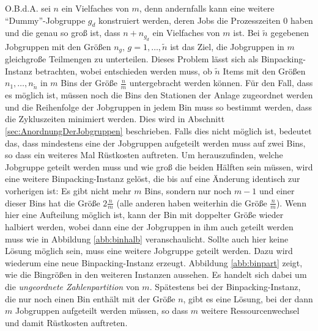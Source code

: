 \documentclass{scrreprt}
\begin{document}
O.B.d.A. sei $n$ ein Vielfaches von $m$, denn andernfalls kann eine weitere "`Dummy"'-Jobgruppe $g_d$ konstruiert werden,
deren Jobs die Prozesszeiten $0$ haben und die genau so groß ist, dass $n+n_{g_d}$ ein Vielfaches von $m$ ist.
Bei $\tilde{n}$ gegebenen Jobgruppen mit den Größen $n_g, \, g=1,\ldots,\tilde{n}$ ist das Ziel,
die Jobgruppen in $m$ gleichgroße Teilmengen zu unterteilen.
Dieses Problem lässt sich als Binpacking-Instanz betrachten, wobei entschieden werden muss, ob $\tilde{n}$ Items 
mit den Größen $n_1,\ldots,n_{\tilde{n}}$ in $m$ Bins der Größe $\frac{n}{m}$ untergebracht werden können.
Für den Fall, dass es möglich ist, müssen noch die Bins den Stationen der Anlage zugeordnet werden und die Reihenfolge
der Jobgruppen in jedem Bin muss so bestimmt werden, dass die Zykluszeiten minimiert werden.
Dies wird in Abschnitt \ref{sec:AnordnungDerJobgruppen} beschrieben.
Falls dies nicht möglich ist, bedeutet das, dass mindestens eine der Jobgruppen aufgeteilt werden muss auf zwei Bins,
so dass ein weiteres Mal Rüstkosten auftreten.
Um herauszufinden, welche Jobgruppe geteilt werden muss und wie groß die beiden Hälften sein müssen,
wird eine weitere Binpacking-Instanz gelöst, die bis auf eine Änderung identisch zur vorherigen ist:
Es gibt nicht mehr $m$ Bins, sondern nur noch $m-1$ und einer dieser Bins hat die Größe $2\frac{n}{m}$ (alle anderen haben weiterhin die Größe $\frac{n}{m}$).
Wenn hier eine Aufteilung möglich ist, kann der Bin mit doppelter Größe wieder halbiert werden,
wobei dann eine der Jobgruppen in ihm auch geteilt werden muss wie in Abbildung \ref{abb:binhalb} veranschaulicht.
Sollte auch hier keine Lösung möglich sein, muss eine weitere Jobgruppe geteilt werden.
Dazu wird wiederum eine neue Binpacking-Instanz erzeugt.
Abbildung \ref{abb:binpart} zeigt, wie die Bingrößen in den weiteren Instanzen aussehen.
Es handelt sich dabei um die \textit{ungeordnete Zahlenpartition} von $m$.
Spätestens bei der Binpacking-Instanz, die nur noch einen Bin enthält mit der Größe $n$, gibt es eine Lösung,
bei der dann $m$ Jobgruppen aufgeteilt werden müssen, so dass $m$ weitere Ressourcenwechsel und damit Rüstkosten auftreten.
\end{document}
